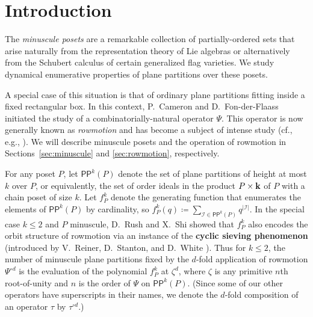 \documentclass[12pt]{amsart}
\theoremstyle{definition}
\theoremstyle{remark}
\numberwithin{equation}{section}
\newcommand{\pp}{\ensuremath{\mathsf{PP}}}
\begin{document}
\maketitle


%
\section{Introduction}
%
\label{sec:introduction}

The \emph{minuscule posets} are a remarkable collection of partially-ordered sets that arise naturally from the representation theory of Lie algebras or alternatively from the Schubert calculus of certain generalized flag varieties. We study dynamical enumerative properties of plane partitions over these posets.

A special case of this situation is that of ordinary plane partitions fitting inside a fixed rectangular box. In this context, P.~Cameron and D.~Fon-der-Flaass \cite{Cameron.Fonderflaass} initiated the study of a combinatorially-natural operator $\Psi$. This operator is now generally known as \emph{rowmotion} and has become a subject of intense study (cf., e.g., \cite{Panyushev,Striker.Williams,Armstrong.Stump.Thomas,Rush.Shi,Einstein.Propp,Propp.Roby,Grinberg.Roby:2,Grinberg.Roby:1,DPS,Vorland, Dilks.Striker.Vorland}).
We will describe minuscule posets and the operation of rowmotion in Sections~\ref{sec:minuscule} and \ref{sec:rowmotion}, respectively.

For any poset $P$, let $\pp^k(P)$ denote the set of plane partitions of height at most $k$ over $P$, or equivalently, the set of order ideals in the product $P \times {\bf k}$ of $P$ with a chain poset of size $k$. Let $f_P^k$ denote the generating function that enumerates the elements of $\pp^k(P)$  by cardinality, so 
$f_P^k(q) \coloneqq \sum_{\mathcal{I} \in \pp^k(P)} q^{|\mathcal{I}|}.$ In the special case $k \leq 2$ and $P$ minuscule, D.~Rush and X.~Shi \cite{Rush.Shi} showed that $f_P^k$ also encodes the orbit structure of rowmotion via an instance of the {\bf cyclic sieving phenomenon} (introduced by V.~Reiner, D.~Stanton, and D.~White \cite{Reiner.Stanton.White}). Thus for $k \leq 2$, the number of minuscule plane partitions fixed by the $d$-fold application of rowmotion $\Psi^{\circ d}$ is the evaluation of the polynomial $f_P^k$ at $\zeta^d$, where $\zeta$ is any primitive $n$th root-of-unity and $n$ is the order of $\Psi$ on $\pp^k(P)$. (Since some of our other operators have superscripts in their names, we denote the $d$-fold composition of an operator $\tau$ by $\tau^{\circ d}$.)
\end{document}
